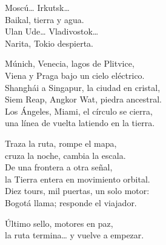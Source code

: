 \begin{lyrics}
Moscú… Irkutsk…\\
Baikal, tierra y agua.\\
Ulan Ude… Vladivostok…\\
Narita, Tokio despierta.

Múnich, Venecia, lagos de Plitvice,\\
Viena y Praga bajo un cielo eléctrico.\\
Shanghái a Singapur, la ciudad en cristal,\\
Siem Reap, Angkor Wat, piedra ancestral.\\
Los Ángeles, Miami, el círculo se cierra,\\
una línea de vuelta latiendo en la tierra.

Traza la ruta, rompe el mapa,\\
cruza la noche, cambia la escala.\\
De una frontera a otra señal,\\
la Tierra entera en movimiento orbital.\\
Diez tours, mil puertas, un solo motor:\\
Bogotá llama; responde el viajador.

Último sello, motores en paz,\\
la ruta termina… y vuelve a empezar.
\end{lyrics}

